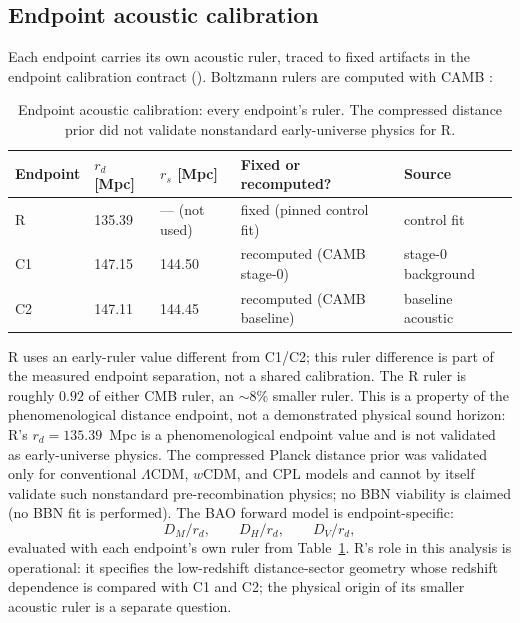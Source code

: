 \subsection{Endpoint acoustic calibration}
\label{sec:calibration}

Each endpoint carries its own acoustic ruler, traced to fixed
artifacts in the endpoint calibration contract
(). Boltzmann
rulers are computed with CAMB \citep{Lewis2000}:

\begin{table}[!htbp]
  \centering
  \caption{Endpoint acoustic calibration: every endpoint's ruler.
  The compressed distance prior \citep{Chen2019} did not validate
  nonstandard early-universe physics for R.}
  \label{tab:calibration}
  \begin{tabular}{lllll}
    \toprule
    Endpoint & $r_{d}$ [Mpc] & $r_{s}$ [Mpc] &
      Fixed or recomputed? & Source \\
    \midrule
    R & 135.39 & --- (not used) &
      fixed (pinned control fit) & control fit \\
    C1 & 147.15 & 144.50 &
      recomputed (CAMB stage-0) & stage-0 background \\
    C2 & 147.11 & 144.45 &
      recomputed (CAMB baseline) & baseline acoustic \\
    \bottomrule
  \end{tabular}
\end{table}

R uses an early-ruler value different from C1/C2; this ruler
difference is part of the measured endpoint separation, not a shared
calibration. The R ruler is roughly $0.92$ of either CMB ruler, an
$\sim8\%$ smaller ruler. This is a property of the phenomenological
distance endpoint, not a demonstrated physical sound horizon: R's
$r_{d}=135.39$~Mpc is a phenomenological endpoint value and is not
validated as early-universe physics. The compressed Planck distance
prior \citep{Chen2019} was validated only for conventional
$\Lambda$CDM, $w$CDM, and CPL models and cannot by itself validate
such nonstandard pre-recombination physics; no BBN viability is
claimed (no BBN fit is performed). The BAO forward model is endpoint-specific:
\begin{equation}
  D_{M}/r_{d},\qquad D_{H}/r_{d},\qquad D_{V}/r_{d},
  \label{eq:bao-forward}
\end{equation}
evaluated with each endpoint's own ruler from
Table~\ref{tab:calibration}.
R's role in this analysis is operational: it specifies the low-redshift distance-sector geometry whose redshift dependence is compared with C1 and C2; the physical origin of its smaller acoustic ruler is a separate question.


